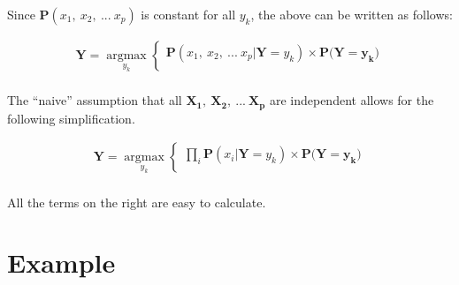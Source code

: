 \documentclass[11pt, a4paper]{article}
\begin{document}
Since $\mathbf{P}(x_1,\ x_2,\ ...\ x_p)$ is constant for all $y_k$, the above can be written as follows: 

\begin{align*}
	\mathbf{Y} = \operatorname*{argmax}_{y_k}\left\{                                    
	\begin{array}{ll}                                                                   
	\mathbf{P}(x_1,\ x_2,\ ...\ x_p | \mathbf{Y}=y_k) \times \mathbf{P}(\mathbf{Y=y_k)} \\
	\end{array}                                                                         
	\right.                                                                             \\
\end{align*}

The ``naive'' assumption that all $\mathbf{X_1},\ \mathbf{X_2},\ ...\ \mathbf{X_p}$ are independent allows for the following simplification.

\begin{align*}
	\mathbf{Y} = \operatorname*{argmax}_{y_k}\left\{                           
	\begin{array}{ll}                                                          
	\prod_{i} \mathbf{P}(x_i|\mathbf{Y}=y_k) \times \mathbf{P}(\mathbf{Y=y_k)} \\
	\end{array}                                                                
	\right.                                                                    \\
\end{align*}

All the terms on the right are easy to calculate.

\section{Example}
\end{document}
